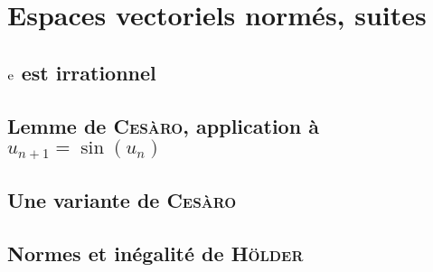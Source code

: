 \chapter{Espaces vectoriels normés, suites}

\section{\texorpdfstring{$\mathrm{e}$}{e} est irrationnel}


\section{Lemme de \textsc{Cesàro}, application à \texorpdfstring{$u_{n+1}=\sin(u_n)$}{u_n+1 = sin(u_n)}}


\section{Une variante de \textsc{Cesàro}}


\section{Normes et inégalité de \textsc{Hölder}}



